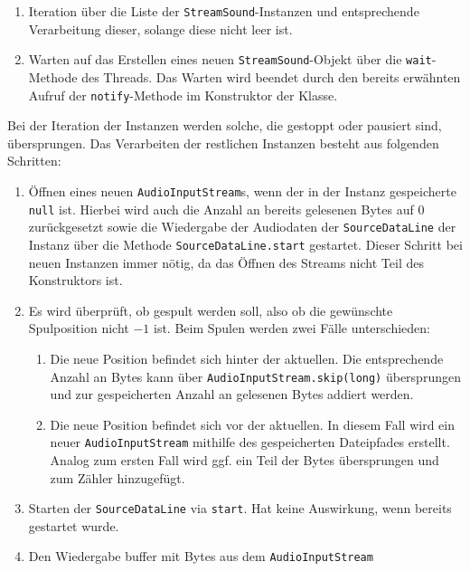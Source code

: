 \begin{sloppypar}
\begin{enumerate}
	\item Iteration über die Liste der \texttt{StreamSound}-Instanzen und
	      entsprechende Verarbeitung dieser, solange diese nicht leer ist.
	\item Warten auf das Erstellen eines neuen \texttt{StreamSound}-Objekt
	      über die \texttt{wait}-Methode des Threads. Das Warten wird beendet
	      durch den bereits erwähnten Aufruf der \texttt{notify}-Methode im
	      Konstruktor der Klasse.
\end{enumerate}

Bei der Iteration der Instanzen werden solche, die gestoppt
oder pausiert sind, übersprungen. Das Verarbeiten der restlichen
Instanzen besteht aus folgenden Schritten:

\begin{enumerate}
	\item Öffnen eines neuen \texttt{AudioInputStream}s, wenn der
	      in der Instanz gespeicherte \texttt{null} ist. Hierbei
	      wird auch die Anzahl an bereits gelesenen Bytes auf $0$
	      zurückgesetzt sowie die Wiedergabe der Audiodaten der
	      \texttt{SourceDataLine} der Instanz über die Methode
	      \texttt{SourceDataLine.start} gestartet.
	      Dieser Schritt bei neuen Instanzen immer nötig, da das Öffnen des
	      Streams nicht Teil des Konstruktors ist.
	\item Es wird überprüft, ob gespult werden soll, also ob die
	      gewünschte Spulposition nicht $-1$ ist. Beim Spulen werden
	      zwei Fälle unterschieden:
	      \begin{enumerate}
	      	\item Die neue Position befindet sich hinter der aktuellen.
	      	      Die entsprechende Anzahl an Bytes kann über \texttt{AudioInputStream.skip(long)}
	      	      übersprungen und zur gespeicherten Anzahl an gelesenen Bytes
	      	      addiert werden.
	      	\item Die neue Position befindet sich vor der aktuellen.
	      	      In diesem Fall wird ein neuer \texttt{AudioInputStream} mithilfe
	      	      des gespeicherten Dateipfades erstellt. Analog
	      	      zum ersten Fall wird ggf. ein Teil der Bytes
	      	      übersprungen und zum Zähler hinzugefügt.
	      \end{enumerate}
	\item Starten der \texttt{SourceDataLine} via \texttt{start}.
	      Hat keine Auswirkung, wenn bereits gestartet wurde.
	\item Den Wiedergabe buffer mit Bytes aus dem \texttt{AudioInputStream}

\end{enumerate}
\end{sloppypar}
